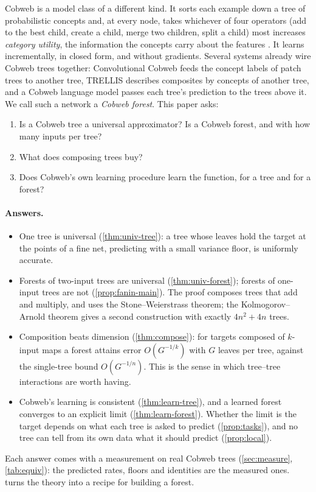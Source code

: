\documentclass[11pt]{article}
\theoremstyle{definition}
\theoremstyle{remark}
\begin{document}
Cobweb \citep{fisher1987} is a model class of a different kind.  It sorts each example
down a tree of probabilistic concepts and, at every node, takes whichever of four
operators (add to the best child, create a child, merge two children, split a child) most
increases \emph{category utility}, the information the concepts carry about the features
\citep{corter1992,maclellan2026rational}.  It learns incrementally, in closed form, and
without gradients.  Several systems already wire Cobweb trees together: Convolutional
Cobweb \citep{maclellan2021conv} feeds the concept labels of patch trees to another tree,
TRELLIS \citep{singaravadivelan2026trellis} describes composites by concepts of another
tree, and a Cobweb language model passes each tree's prediction to the trees above it.  We
call such a network a \emph{Cobweb forest}.  This paper asks:
\begin{enumerate}[label=\textbf{Q\arabic*.},leftmargin=*,noitemsep]
\item Is a Cobweb tree a universal approximator?  Is a Cobweb forest, and with how many
  inputs per tree?
\item What does composing trees buy?
\item Does Cobweb's own learning procedure learn the function, for a tree and for a forest?
\end{enumerate}

\paragraph{Answers.}
\begin{itemize}[leftmargin=*,noitemsep]
\item One tree is universal (\cref{thm:univ-tree}): a tree whose leaves hold the target at
  the points of a fine net, predicting with a small variance floor, is uniformly accurate.
\item Forests of two-input trees are universal (\cref{thm:univ-forest}); forests of
  one-input trees are not (\cref{prop:fanin-main}).  The proof composes trees that add and
  multiply, and uses the Stone--Weierstrass theorem; the Kolmogorov--Arnold theorem gives a
  second construction with exactly $4n^2+4n$ trees.
\item Composition beats dimension (\cref{thm:compose}): for targets composed of $k$-input
  maps a forest attains error $O(G^{-1/k})$ with $G$ leaves per tree, against the single-tree
  bound $O(G^{-1/n})$.  This is the sense in which tree--tree interactions are worth having.
\item Cobweb's learning is consistent (\cref{thm:learn-tree}), and a learned forest
  converges to an explicit limit (\cref{thm:learn-forest}).  Whether the limit is the target
  depends on what each tree is asked to predict (\cref{prop:tasks}), and no tree can tell from
  its own data what it should predict (\cref{prop:local}).
\end{itemize}
Each answer comes with a measurement on real Cobweb trees (\cref{sec:measure},
\cref{tab:equiv}): the predicted rates, floors and identities are the measured ones.
 turns the theory into a recipe for building a forest.
\end{document}
